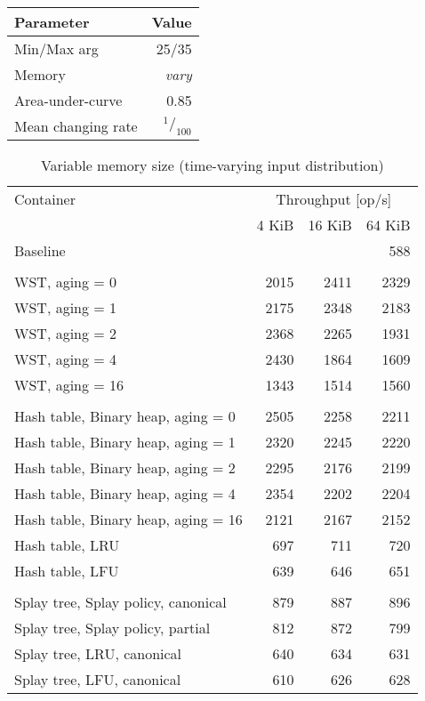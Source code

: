 \pagebreak

\begin{tabular}[h]{l r} \toprule
Parameter & Value \\ \midrule
Min/Max arg & 25/35 \\
Memory & \emph{vary} \\
Area-under-curve & 0.85 \\
Mean changing rate & $^1/_{100}$ \\ \bottomrule
\end{tabular}

\begin{table}
\caption{Variable memory size (time-varying input distribution)}
\begin{tabular}[]{l  r  r  r } \toprule
Container & \multicolumn{3}{c}{Throughput [op/s]} \\ \cmidrule(r){2-4}
& 4 KiB & 16 KiB & 64 KiB \\ \midrule
Baseline & \multicolumn{3}{r}{588}  \\
\\
WST, aging = 0 & 2015 & 2411 & 2329 \\
WST, aging = 1 & 2175 & 2348 & 2183 \\
WST, aging = 2 & 2368 & 2265 & 1931 \\
WST, aging = 4 & 2430 & 1864 & 1609 \\
WST, aging = 16 & 1343 & 1514 & 1560 \\
\\
Hash table, Binary heap, aging = 0 & 2505 & 2258 & 2211 \\
Hash table, Binary heap, aging = 1 & 2320 & 2245 & 2220 \\
Hash table, Binary heap, aging = 2 & 2295 & 2176 & 2199 \\
Hash table, Binary heap, aging = 4 & 2354 & 2202 & 2204 \\
Hash table, Binary heap, aging = 16 & 2121 & 2167 & 2152 \\
Hash table, LRU & 697 & 711 & 720 \\
Hash table, LFU & 639 & 646 & 651 \\
\\
Splay tree, Splay policy, canonical & 879 & 887 & 896 \\
Splay tree, Splay policy, partial & 812 & 872 & 799 \\
Splay tree, LRU, canonical & 640 & 634 & 631 \\
Splay tree, LFU, canonical & 610 & 626 & 628 \\
\bottomrule
\end{tabular}
\end{table}

